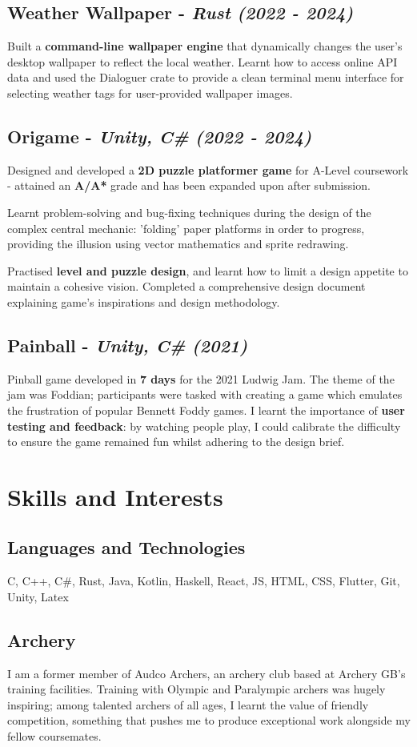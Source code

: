 \documentclass{article}
\newcommand{\dates}[1]{\hfill\textit{(#1)}}
\newcommand{\indentedblock}[1]{
    \hfill
    \begin{minipage}{\dimexpr\textwidth - 0.65cm}
        #1
    \end{minipage}
}
\newcommand{\project}[4]{
    \subsection*{\textbf{#1} - \textit{#3} \dates{#2}}
    \indentedblock{#4}
}
\begin{document}
\project{Weather Wallpaper}{2022 - 2024}{Rust}{
    Built a \textbf{command-line wallpaper engine} that dynamically changes the user's desktop wallpaper to reflect the local weather. 
    Learnt how to access online API data and used the Dialoguer crate to provide a clean terminal menu interface for selecting weather tags for 
    user-provided wallpaper images.
}

\project{Origame}{2022 - 2024}{Unity, C\#}{
    Designed and developed a \textbf{2D puzzle platformer game} for A-Level coursework - attained an \textbf{A/A*} grade
    and has been expanded upon after submission. 
 
    Learnt problem-solving and bug-fixing techniques during the design of the complex central mechanic: 
    'folding' paper platforms in order to progress, providing the illusion using vector mathematics and sprite redrawing.
 
    Practised \textbf{level and puzzle design}, and learnt how to limit a design appetite to maintain a cohesive vision.  
    Completed a comprehensive design document explaining game's inspirations and design methodology.
}

\project{Painball}{2021}{Unity, C\#}{
    Pinball game developed in \textbf{7 days} for the 2021 Ludwig Jam. The theme of the jam was Foddian; 
    participants were tasked with creating a game which emulates the frustration of popular Bennett Foddy games.
    I learnt the importance of \textbf{user testing and feedback}: by watching people play, I could calibrate the difficulty
    to ensure the game remained fun whilst adhering to the design brief. 
}
    

\section*{Skills and Interests}

\subsection*{\textbf{Languages and Technologies}}
\indentedblock{
    C, C++, C\#, Rust, Java, Kotlin, Haskell, React, JS, HTML, CSS, Flutter, Git, Unity, Latex
}

\subsection*{\textbf{Archery}}
\indentedblock{
    I am a former member of Audco Archers, an archery club based at Archery GB's training facilities.
    Training with Olympic and Paralympic archers was hugely inspiring; among talented archers of all ages, 
    I learnt the value of friendly competition, something that pushes me to produce exceptional work alongside 
    my fellow coursemates.
}
\end{document}
